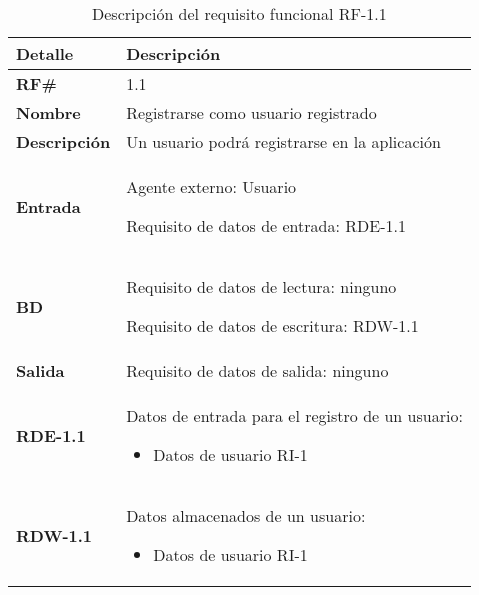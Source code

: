 \begin{table}[H]
    \centering
    \begin{tabular}{|p{3cm}|p{8cm}|}
        \hline
        \rowcolor{lightgray}
        \textbf{Detalle} & \textbf{Descripción} \\
        \hline
        \textbf{RF\#} & 1.1 \\
        \hline
        \textbf{Nombre} & Registrarse como usuario registrado \\
        \hline
        \textbf{Descripción} & Un usuario podrá registrarse en la aplicación \\
        \hline
        \textbf{Entrada} &
        Agente externo: Usuario
        
        Requisito de datos de entrada: RDE-1.1 \\
        \hline
        \textbf{BD} &
        Requisito de datos de lectura: ninguno
        
        Requisito de datos de escritura: RDW-1.1 \\
        \hline
        \textbf{Salida} & Requisito de datos de salida: ninguno \\
        \hline
        \textbf{RDE-1.1} & Datos de entrada para el registro de un usuario:
            \begin{itemize}
                \item Datos de usuario RI-1
            \end{itemize} \\
        \hline
        \textbf{RDW-1.1} & Datos almacenados de un usuario:
            \begin{itemize}
                \item Datos de usuario RI-1
            \end{itemize} \\
        \hline
    \end{tabular}
    \caption{Descripción del requisito funcional RF-1.1}
    \label{tab:rf-1-1}
\end{table}

